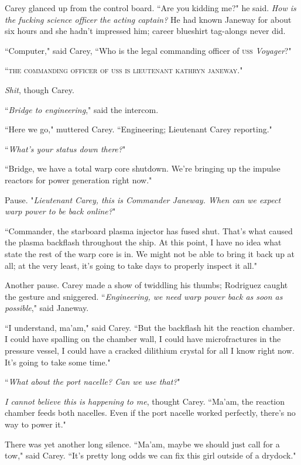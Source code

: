 \documentclass[twoside,letterpaper,12pt]{memoir}
\begin{document}
Carey glanced up from the control board. ``Are you kidding me?" he said. \textit{How is the fucking science officer the acting captain?} He had known Janeway for about six hours and she hadn't impressed him; career blueshirt tag-alongs never did.

``Computer," said Carey, ``Who is the legal commanding officer of \textsc{uss} \textit{Voyager}?"

``\textsc{the commanding officer of uss}  \textsc{is lieutenant kathryn janeway}."

\textit{Shit}, though Carey.

``\textit{Bridge to engineering}," said the intercom.

``Here we go," muttered Carey. ``Engineering; Lieutenant Carey reporting."

``\textit{What's your status down there?}"

``Bridge, we have a total warp core shutdown. We're bringing up the impulse reactors for power generation right now."

Pause. "\textit{Lieutenant Carey, this is Commander Janeway. When can we expect warp power to be back online?}"

``Commander, the starboard plasma injector has fused shut. That's what caused the plasma backflash throughout the ship. At this point, I have no idea what state the rest of the warp core is in. We might not be able to bring it back up at all; at the very least, it's going to take days to properly inspect it all."

Another pause. Carey made a show of twiddling his thumbs; Rodriguez caught the gesture and sniggered. ``\textit{Engineering, we need warp power back as soon as possible}," said Janeway.

``I understand, ma'am," said Carey. ``But the backflash hit the reaction chamber. I could have spalling on the chamber wall, I could have microfractures in the pressure vessel, I could have a cracked dilithium crystal for all I know right now. It's going to take some time."

``\textit{What about the port nacelle? Can we use that?}"

\textit{I cannot believe this is happening to me}, thought Carey. ``Ma'am, the reaction chamber feeds both nacelles. Even if the port nacelle worked perfectly, there's no way to power it."

There was yet another long silence. ``Ma'am, maybe we should just call for a tow," said Carey. ``It's pretty long odds we can fix this girl outside of a drydock."
\end{document}
